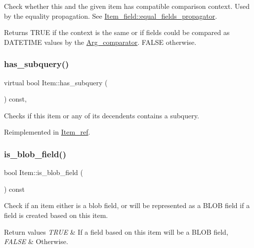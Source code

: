 Check whether this and the given item has compatible comparison context. Used by the equality propagation. See \mbox{\hyperlink{classItem__field_af886c8bd34afb6700eabba7cb508866a}{Item\+\_\+field\+::equal\+\_\+fields\+\_\+propagator}}.

\begin{DoxyReturn}{Returns}
T\+R\+UE if the context is the same or if fields could be compared as D\+A\+T\+E\+T\+I\+ME values by the \mbox{\hyperlink{classArg__comparator}{Arg\+\_\+comparator}}. F\+A\+L\+SE otherwise. 
\end{DoxyReturn}
\mbox{\label{classItem_a555481d359fe1f802b42497d4c39444f}} 
\subsubsection{\texorpdfstring{has\+\_\+subquery()}{has\_subquery()}}
{\footnotesize\ttfamily virtual bool Item\+::has\+\_\+subquery (\begin{DoxyParamCaption}{ }\end{DoxyParamCaption}) const\hspace{0.3cm}{\ttfamily [inline]}, {\ttfamily [virtual]}}

Checks if this item or any of its decendents contains a subquery. 

Reimplemented in \mbox{\hyperlink{classItem__ref_a3d3e749004c6da772dab1aec83066aa0}{Item\+\_\+ref}}.

\mbox{\label{classItem_aa4a4bee673e7e8dedc1c4f7c283188ea}} 
\subsubsection{\texorpdfstring{is\+\_\+blob\+\_\+field()}{is\_blob\_field()}}
{\footnotesize\ttfamily bool Item\+::is\+\_\+blob\+\_\+field (\begin{DoxyParamCaption}{ }\end{DoxyParamCaption}) const}

Check if an item either is a blob field, or will be represented as a B\+L\+OB field if a field is created based on this item.


\begin{DoxyRetVals}{Return values}
{\em T\+R\+UE} & If a field based on this item will be a B\+L\+OB field, \\
\hline
{\em F\+A\+L\+SE} & Otherwise. \\
\hline
\end{DoxyRetVals}
\mbox{\label{classItem_a24e82d279a8907ad502faebb3abe1ab1}} 

